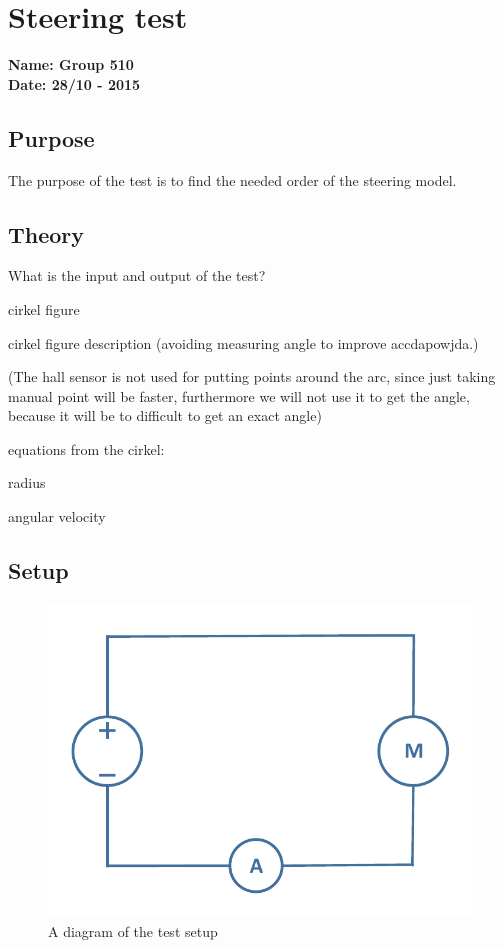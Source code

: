 \pagebreak
\section{Steering test} %
\textbf{Name: Group 510}\\
\textbf{Date: 28/10 - 2015}

\subsection{Purpose}
The purpose of the test is to find the needed order of the steering model.

\subsection{Theory}


What is the input and output of the test?

cirkel figure

cirkel figure description (avoiding measuring angle to improve accdapowjda.)

(The hall sensor is not used for putting points around the arc, since just taking manual point will be faster, furthermore we will not use it to get the angle, because it will be to difficult to get an exact angle)

equations from the cirkel:

radius

angular velocity

\subsection{Setup}
\begin{figure}[H]
  \centering
	\includegraphics[scale=0.5]{figures/FrictionTest.pdf}
	\caption{A diagram of the test setup}
\end{figure}


